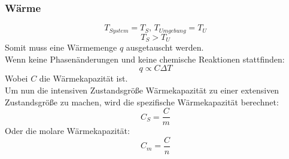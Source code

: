 \documentclass[a4paper, fleqn]{article}
\begin{document}
\subsubsection{Wärme}
\begin{equation*}
    T_{System} = T_S,\,T_{Umgebung} = T_U
\end{equation*}
\begin{equation*}
    T_S > T_U
\end{equation*}
Somit muss eine Wärmemenge $q$ ausgetauscht werden.\\
Wenn keine Phasenänderungen und keine chemische Reaktionen stattfinden:
\begin{equation*}
    q \varpropto C \Delta T
\end{equation*}
Wobei $C$ die Wärmekapazität ist.\\
Um nun die intensiven Zustandsgröße Wärmekapazität zu einer extensiven Zustandsgröße zu machen, wird die spezifische Wärmekapazität berechnet:
\begin{equation*}
    C_S = \frac{C}{m}
\end{equation*}
Oder die molare Wärmekapazität:
\begin{equation*}
    C_m = \frac{C}{n}
\end{equation*}
\end{document}
